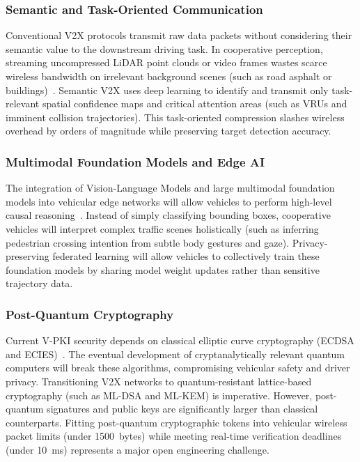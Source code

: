 \subsubsection{Semantic and Task-Oriented Communication}
Conventional V2X protocols transmit raw data packets without considering their semantic value to the downstream driving task.
In cooperative perception, streaming uncompressed LiDAR point clouds or video frames wastes scarce wireless bandwidth on irrelevant background scenes (such as road asphalt or buildings)~\cite{huang2025v2x}.
Semantic V2X uses deep learning to identify and transmit only task-relevant spatial confidence maps and critical attention areas (such as VRUs and imminent collision trajectories).
This task-oriented compression slashes wireless overhead by orders of magnitude while preserving target detection accuracy.

\subsubsection{Multimodal Foundation Models and Edge AI}
The integration of Vision-Language Models and large multimodal foundation models into vehicular edge networks will allow vehicles to perform high-level causal reasoning~\cite{huang2025v2x}.
Instead of simply classifying bounding boxes, cooperative vehicles will interpret complex traffic scenes holistically (such as inferring pedestrian crossing intention from subtle body gestures and gaze).
Privacy-preserving federated learning will allow vehicles to collectively train these foundation models by sharing model weight updates rather than sensitive trajectory data.

\subsubsection{Post-Quantum Cryptography}
Current V-PKI security depends on classical elliptic curve cryptography (ECDSA and ECIES)~\cite{brecht2018scms}.
The eventual development of cryptanalytically relevant quantum computers will break these algorithms, compromising vehicular safety and driver privacy.
Transitioning V2X networks to quantum-resistant lattice-based cryptography (such as ML-DSA and ML-KEM) is imperative.
However, post-quantum signatures and public keys are significantly larger than classical counterparts.
Fitting post-quantum cryptographic tokens into vehicular wireless packet limits (under 1500~bytes) while meeting real-time verification deadlines (under 10~ms) represents a major open engineering challenge.
